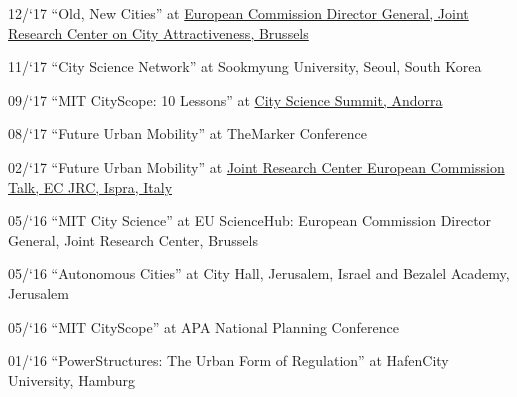 \begin{tablist}
    \item[12/`17] \tab \enquote{Old, New Cities} at \href{https://www.youtube.com/watch?v=AW-ljDEleLw}{European Commission Director General, Joint Research Center on City Attractiveness, Brussels}

    \item[11/`17] \tab \enquote{City Science Network} at {Sookmyung University, Seoul, South Korea}

    \item[09/`17] \tab \enquote{MIT CityScope: 10 Lessons} at \href{https://www.youtube.com/watch?v=bRNbap13I5w}{City Science Summit, Andorra}


    \item[08/`17] \tab \enquote{Future Urban Mobility} at {TheMarker Conference}

    \item[02/`17] \tab \enquote{Future Urban Mobility} at \href{https://ec.europa.eu/jrc/en/event/conference/14th-jrc-annual-training-composite-indicators-and-scoreboards} {Joint Research Center European Commission Talk, EC JRC, Ispra, Italy}

    \item[05/`16] \tab \enquote{MIT City Science} at {EU ScienceHub:
        European Commission Director General, Joint Research Center, Brussels}

    \item[05/`16] \tab \enquote{Autonomous Cities} at {City Hall, Jerusalem, Israel and Bezalel Academy, Jerusalem}


    \item[05/`16] \tab \enquote{MIT CityScope} at {APA National Planning Conference}

    \item[01/`16] \tab \enquote{PowerStructures: The Urban Form of Regulation} at {HafenCity University, Hamburg}

\end{tablist}

